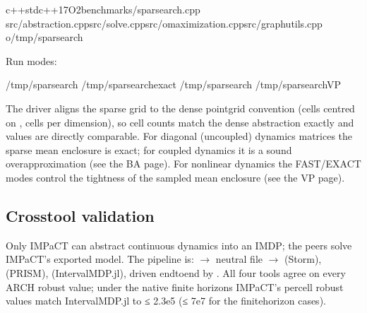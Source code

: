 \documentclass[a4paper,10pt,english]{sphinxmanual}
\begin{document}
\begin{sphinxVerbatim}[commandchars=\\\{\}]
c++\PYGZhy{}stdc++17\PYGZhy{}O2benchmarks/sparse\PYGZus{}arch.cpp
src/abstraction.cppsrc/solve.cppsrc/omaximization.cppsrc/graph\PYGZus{}utils.cpp
\PYGZhy{}o/tmp/sparse\PYGZus{}arch
\end{sphinxVerbatim}

\sphinxAtStartPar
Run modes:

\begin{sphinxVerbatim}[commandchars=\\\{\}]
/tmp/sparse\PYGZus{}arch
/tmp/sparse\PYGZus{}archexact
/tmp/sparse\PYGZus{}arch
/tmp/sparse\PYGZus{}archVP
\end{sphinxVerbatim}

\sphinxAtStartPar
The driver aligns the sparse grid to the dense point\sphinxhyphen{}grid convention (cells centred on
,  cells per dimension), so cell counts match the dense
abstraction exactly and values are directly comparable. For diagonal (uncoupled)
dynamics matrices the sparse mean enclosure is exact; for coupled dynamics it is a
sound over\sphinxhyphen{}approximation (see the BA page). For nonlinear dynamics the FAST/EXACT
modes control the tightness of the sampled mean enclosure (see the VP page).


\subsection{Cross\sphinxhyphen{}tool validation}
\label{\detokenize{benchmarks/index:cross-tool-validation}}
\sphinxAtStartPar
Only IMPaCT can abstract continuous dynamics into an IMDP; the peers solve IMPaCT’s
exported model. The pipeline is:  \(\rightarrow\) neutral  file \(\rightarrow\)
 (Storm),  (PRISM),
 (IntervalMDP.jl), driven end\sphinxhyphen{}to\sphinxhyphen{}end by
. All four tools agree on every ARCH
robust value; under the native finite horizons IMPaCT’s per\sphinxhyphen{}cell robust values match
IntervalMDP.jl to ≤ 2.3e\sphinxhyphen{}5 (≤ 7e\sphinxhyphen{}7 for the finite\sphinxhyphen{}horizon cases).
\end{document}
